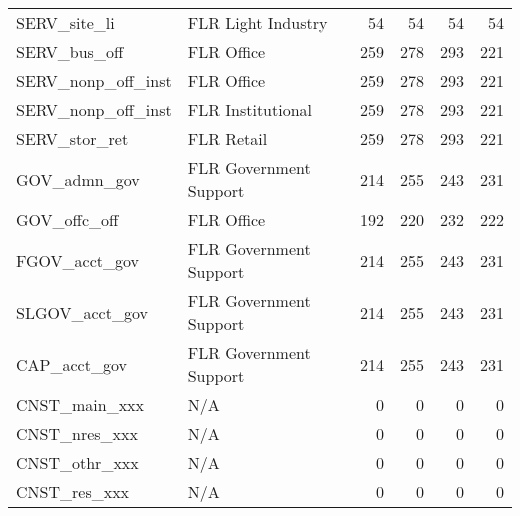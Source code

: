 \begin{small}
\begin{longtable}{llrrrr}
SERV\_site\_li & FLR Light Industry & 54 & 54 & 54 & 54 \\
SERV\_bus\_off & FLR Office & 259 & 278 & 293 & 221 \\
SERV\_nonp\_off\_inst & FLR Office & 259 & 278 & 293 & 221 \\
SERV\_nonp\_off\_inst & FLR Institutional & 259 & 278 & 293 & 221 \\
SERV\_stor\_ret & FLR Retail & 259 & 278 & 293 & 221 \\
GOV\_admn\_gov & FLR Government Support & 214 & 255 & 243 & 231 \\
GOV\_offc\_off & FLR Office & 192 & 220 & 232 & 222 \\
FGOV\_acct\_gov & FLR Government Support & 214 & 255 & 243 & 231 \\
SLGOV\_acct\_gov & FLR Government Support & 214 & 255 & 243 & 231 \\
CAP\_acct\_gov & FLR Government Support & 214 & 255 & 243 & 231 \\
CNST\_main\_xxx & N/A & 0 & 0 & 0 & 0 \\
CNST\_nres\_xxx & N/A & 0 & 0 & 0 & 0 \\
CNST\_othr\_xxx & N/A & 0 & 0 & 0 & 0 \\
CNST\_res\_xxx &  N/A & 0 & 0 & 0 & 0 \\ 
\end{longtable}
\end{small}
